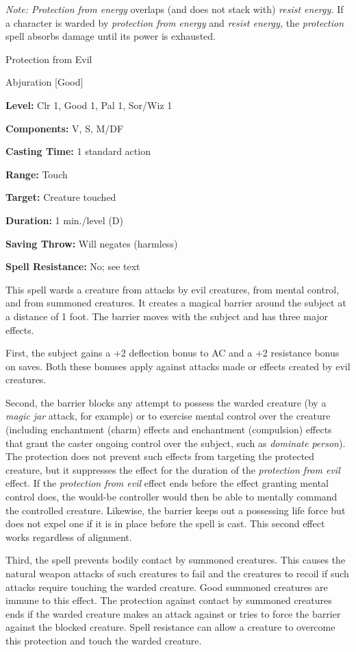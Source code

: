 \documentclass{article}
\begin{document}
\textit{Note: Protection from energy }overlaps (and does not stack with) \textit{resist 
energy. }If a character is warded by \textit{protection from energy }and \textit{resist 
energy, }the \textit{protection }spell absorbs damage until its power is exhausted.

\vspace{12pt}
Protection from Evil

Abjuration [Good]

\textbf{Level:} Clr 1, Good 1, Pal 1, Sor/Wiz 1

\textbf{Components:} V, S, M/DF

\textbf{Casting Time:} 1 standard action

\textbf{Range:} Touch

\textbf{Target:} Creature touched

\textbf{Duration:} 1 min./level (D)

\textbf{Saving Throw: }Will negates (harmless)

\textbf{Spell Resistance:} No; see text

This spell wards a creature from attacks by evil creatures, from mental control, 
and from summoned creatures. It creates a magical barrier around the subject at 
a distance of 1 foot. The barrier moves with the subject and has three major effects.

First, the subject gains a +2 deflection bonus to AC and a +2 resistance bonus 
on saves. Both these bonuses apply against attacks made or effects created by evil 
creatures.

Second, the barrier blocks any attempt to possess the warded creature (by a \textit{magic 
jar }attack, for example) or to exercise mental control over the creature (including 
enchantment (charm) effects and enchantment (compulsion) effects that grant the 
caster ongoing control over the subject, such as \textit{dominate person}). The 
protection does not prevent such effects from targeting the protected creature, 
but it suppresses the effect for the duration of the \textit{protection from evil 
}effect. If the \textit{protection from evil }effect ends before the effect granting 
mental control does, the would-be controller would then be able to mentally command 
the controlled creature. Likewise, the barrier keeps out a possessing life force 
but does not expel one if it is in place before the spell is cast. This second 
effect works regardless of alignment.

Third, the spell prevents bodily contact by summoned creatures. This causes the 
natural weapon attacks of such creatures to fail and the creatures to recoil if 
such attacks require touching the warded creature. Good summoned creatures are 
immune to this effect. The protection against contact by summoned creatures ends 
if the warded creature makes an attack against or tries to force the barrier against 
the blocked creature. Spell resistance can allow a creature to overcome this protection 
and touch the warded creature.
\end{document}

